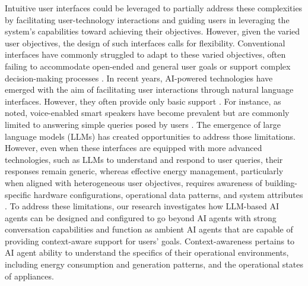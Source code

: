 \documentclass[final,3p,times]{elsarticle}
\begin{document}
Intuitive user interfaces could be leveraged to partially address these complexities by facilitating user-technology interactions and guiding users in leveraging the system's capabilities toward achieving their objectives. However, given the varied user objectives, the design of such interfaces calls for flexibility. Conventional interfaces have commonly struggled to adapt to these varied objectives, often failing to accommodate open-ended and general user goals or support complex decision-making processes \cite{jin2023human}. In recent years, AI-powered technologies have emerged with the aim of facilitating user interactions through natural language interfaces. However, they often provide only basic support \cite{avdic2020intelligibility}. For instance, as noted, voice-enabled smart speakers have become prevalent but are commonly limited to answering simple queries posed by users \cite{avdic2020intelligibility}. The emergence of large language models (LLMs) has created opportunities to address those limitations. However, even when these interfaces are equipped with more advanced technologies, such as LLMs to understand and respond to user queries, their responses remain generic, whereas effective energy management, particularly when aligned with heterogeneous user objectives, requires awareness of building-specific hardware configurations, operational data patterns, and system attributes \cite{han2023home}. To address these limitations, our research investigates how LLM-based AI agents can be designed and configured to go beyond AI agents with strong conversation capabilities and function as ambient AI agents that are capable of providing context-aware support for users' goals. Context-awareness pertains to AI agent ability to understand the specifics of their operational environments, including energy consumption and generation patterns, and the operational states of appliances.
\end{document}
